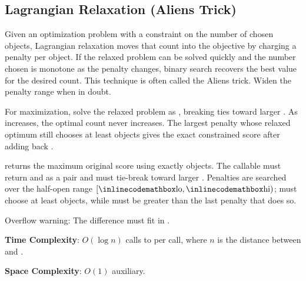 \subsection{Lagrangian Relaxation (Aliens Trick)}
\label{sec:5.3.4}
Given an optimization problem with a constraint on the number of chosen objects, Lagrangian relaxation moves that count into the objective by charging a penalty per object. If the relaxed problem can be solved quickly and the number chosen is monotone as the penalty changes, binary search recovers the best value for the desired count. This technique is often called the Aliens trick. Widen the penalty range when in doubt.

For maximization, solve the relaxed problem as , breaking ties toward larger . As  increases, the optimal count never increases. The largest penalty whose relaxed optimum still chooses at least  objects gives the exact constrained score after adding back .

\begin{compactitem}
  \item {} returns the maximum original score using exactly  objects. The callable  must return  and  as a pair and must tie-break toward larger . Penalties are searched over the half-open range $[{\inlinecodemath{lo}}, {\inlinecodemath{hi}})$;  must choose at least  objects, while  must be greater than the last penalty that does so.
\end{compactitem}

Overflow warning: The difference  must fit in .

\textbf{Time Complexity}: $O(\log n)$ calls to  per call, where $n$ is the distance between  and .

\textbf{Space Complexity}: $O(1)$ auxiliary.

